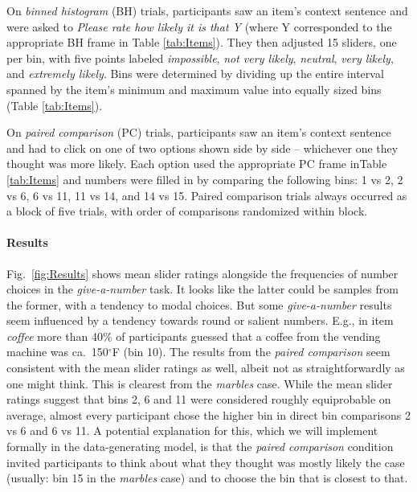 \documentclass[10pt,letterpaper]{article}
\newcommand{\tableref}[1]{Table \ref{#1}}
\newcommand{\figref}[1]{Fig.~\ref{#1}}
\begin{document}
On \emph{binned histogram} (BH) trials, participants saw an item's context sentence and were
asked to \emph{Please rate how likely it is that Y} (where Y corresponded to the appropriate BH
frame in \tableref{tab:Items}). They then adjusted 15 sliders, one per bin, with five points
labeled \emph{impossible}, \emph{not very likely}, \emph{neutral}, \emph{very likely}, and
\emph{extremely likely}. Bins were determined by dividing up the entire interval spanned by the
item's minimum and maximum value into equally sized bins (\tableref{tab:Items}).



On \emph{paired comparison} (PC) trials, participants saw an item's context sentence and had to
click on one of two options shown side by side -- whichever one they thought was more likely.
Each option used the appropriate PC frame in\tableref{tab:Items} and numbers were filled in by
comparing the following bins: 1 vs 2, 2 vs 6, 6 vs 11, 11 vs 14, and 14 vs 15. Paired
comparison trials always occurred as a block of five trials, with order of comparisons
randomized within block.


\paragraph{Results} \figref{fig:Results} shows mean slider ratings alongside the frequencies of
number choices in the \emph{give-a-number} task. It looks like the latter could be samples from
the former, with a tendency to modal choices. But some \emph{give-a-number} results seem
influenced by a tendency towards round or salient numbers. E.g., in item \emph{coffee} more
than 40\% of participants guessed that a coffee from the vending machine was ca.~150$^{\circ}$F
(bin 10). The results from the \emph{paired comparison} seem consistent with the mean slider
ratings as well, albeit not as straightforwardly as one might think. This is clearest from the
\emph{marbles} case. While the mean slider ratings suggest that bins 2, 6 and 11 were
considered roughly equiprobable on average, almost every participant chose the higher bin in
direct bin comparisons 2 vs 6 and 6 vs 11. A potential explanation for this, which we will
implement formally in the data-generating model, is that the \emph{paired comparison} condition
invited participants to think about what they thought was mostly likely the case (usually: bin
15 in the \emph{marbles} case) and to choose the bin that is closest to that.
\end{document}
